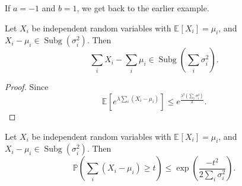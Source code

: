 \begin{note}
	If \(a = -1\) and \(b = 1\), we get back to the earlier example.
\end{note}

\begin{lemma}
	Let \(X_i\) be independent random variables with \(\mathbb{E}_{}\left[X_i \right] = \mu _i\), and \(X_i - \mu _i \in \mathop{\mathrm{Subg}}\left( \sigma _i^2 \right)  \). Then
	\[
		\sum_{i} X_i - \sum_{i} \mu _i \in \mathop{\mathrm{Subg}}\left( \sum_{i} \sigma _i^2 \right) .
	\]
\end{lemma}
\begin{proof}
	Since
	\[
		\mathbb{E}_{}\left[e^{\lambda \sum_{i} (X_i - \mu _i)} \right] \leq e^{\frac{\lambda ^2 (\sum_{i} \sigma _i^2)}{2}}.
	\]
\end{proof}

\begin{lemma}\label{lma:Hoeffding-inequality}
	Let \(X_i\) be independent random variables with \(\mathbb{E}_{}\left[X_i \right] = \mu _i\), and \(X_i - \mu _i \in \mathop{\mathrm{Subg}}(\sigma _i^2) \). Then
	\[
		\mathbb{P} \left( \sum_{i} (X_i - \mu _i) \geq t \right)  \leq \exp (\frac{-t^2}{2 \sum_{i} \sigma _i^2}).
	\]
\end{lemma}